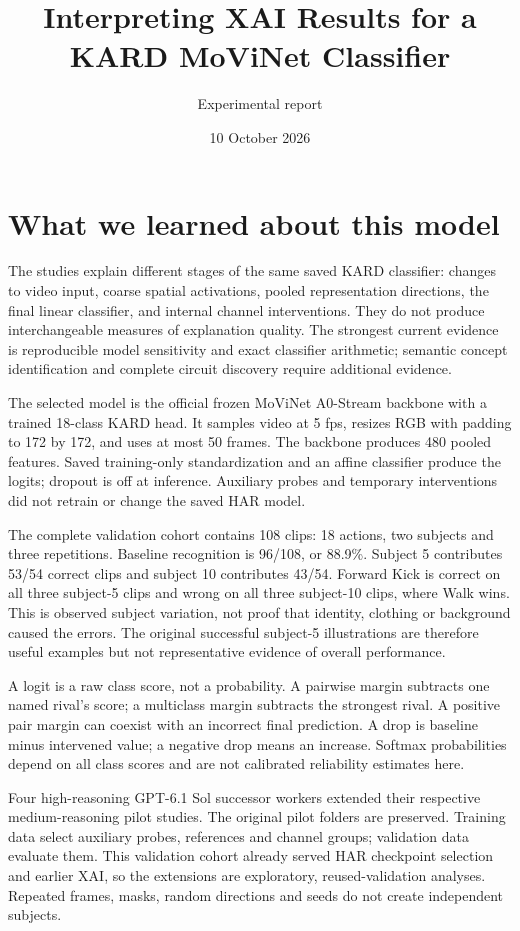 \documentclass[11pt]{article}
\title{Interpreting XAI Results for a KARD MoViNet Classifier}
\author{Experimental report}
\date{10 October 2026}
\begin{document}
\maketitle

\section{What we learned about this model}
The studies explain different stages of the same saved KARD classifier: changes to video input, coarse spatial activations, pooled representation directions, the final linear classifier, and internal channel interventions. They do not produce interchangeable measures of explanation quality. The strongest current evidence is reproducible model sensitivity and exact classifier arithmetic; semantic concept identification and complete circuit discovery require additional evidence.

The selected model is the official frozen MoViNet A0-Stream backbone with a trained 18-class KARD head. It samples video at 5 fps, resizes RGB with padding to 172 by 172, and uses at most 50 frames. The backbone produces 480 pooled features. Saved training-only standardization and an affine classifier produce the logits; dropout is off at inference. Auxiliary probes and temporary interventions did not retrain or change the saved HAR model.

The complete validation cohort contains 108 clips: 18 actions, two subjects and three repetitions. Baseline recognition is 96/108, or 88.9\%. Subject 5 contributes 53/54 correct clips and subject 10 contributes 43/54. Forward Kick is correct on all three subject-5 clips and wrong on all three subject-10 clips, where Walk wins. This is observed subject variation, not proof that identity, clothing or background caused the errors. The original successful subject-5 illustrations are therefore useful examples but not representative evidence of overall performance.

A logit is a raw class score, not a probability. A pairwise margin subtracts one named rival's score; a multiclass margin subtracts the strongest rival. A positive pair margin can coexist with an incorrect final prediction. A drop is baseline minus intervened value; a negative drop means an increase. Softmax probabilities depend on all class scores and are not calibrated reliability estimates here.

Four high-reasoning GPT-6.1 Sol successor workers extended their respective medium-reasoning pilot studies. The original pilot folders are preserved. Training data select auxiliary probes, references and channel groups; validation data evaluate them. This validation cohort already served HAR checkpoint selection and earlier XAI, so the extensions are exploratory, reused-validation analyses. Repeated frames, masks, random directions and seeds do not create independent subjects.
\end{document}
